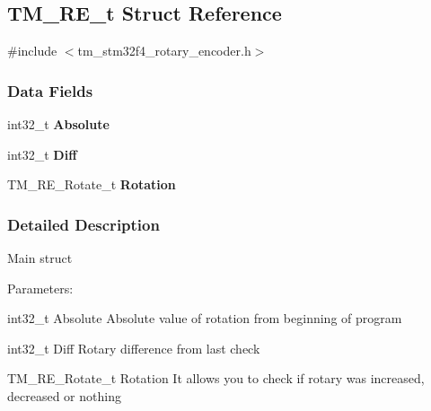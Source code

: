 \hypertarget{struct_t_m___r_e__t}{}\subsection{T\+M\+\_\+\+R\+E\+\_\+t Struct Reference}
\label{struct_t_m___r_e__t}


{\ttfamily \#include $<$tm\+\_\+stm32f4\+\_\+rotary\+\_\+encoder.\+h$>$}

\subsubsection*{Data Fields}
\begin{DoxyCompactItemize}
\item 
\hypertarget{struct_t_m___r_e__t_a9c8bdbbcdc3ac3d151ee0adb2c2d01ca}{}int32\+\_\+t {\bfseries Absolute}\label{struct_t_m___r_e__t_a9c8bdbbcdc3ac3d151ee0adb2c2d01ca}

\item 
\hypertarget{struct_t_m___r_e__t_a68bacec042a4bcd6f4024c669bb2266e}{}int32\+\_\+t {\bfseries Diff}\label{struct_t_m___r_e__t_a68bacec042a4bcd6f4024c669bb2266e}

\item 
\hypertarget{struct_t_m___r_e__t_aff5ba57fddc27e06b2a46669b3df8b9c}{}T\+M\+\_\+\+R\+E\+\_\+\+Rotate\+\_\+t {\bfseries Rotation}\label{struct_t_m___r_e__t_aff5ba57fddc27e06b2a46669b3df8b9c}

\end{DoxyCompactItemize}


\subsubsection{Detailed Description}
Main struct

Parameters\+:
\begin{DoxyItemize}
\item int32\+\_\+t Absolute Absolute value of rotation from beginning of program
\end{DoxyItemize}

int32\+\_\+t Diff Rotary difference from last check
\begin{DoxyItemize}
\item T\+M\+\_\+\+R\+E\+\_\+\+Rotate\+\_\+t Rotation It allows you to check if rotary was increased, decreased or nothing 
\end{DoxyItemize}